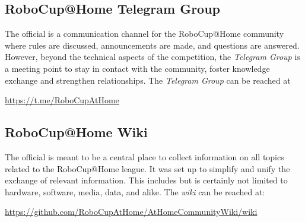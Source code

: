 \subsection{RoboCup@Home Telegram Group}
The official  is a communication channel for the RoboCup@Home community where rules are discussed, announcements are made, and questions are answered.
However, beyond the technical aspects of the competition, the \textit{Telegram Group} is a meeting point to stay in contact with the community, foster knowledge exchange and strengthen relationships.
The \textit{Telegram Group} can be reached at
\begin{center}
{\small\url{https://t.me/RoboCupAtHome}}
\end{center}

\subsection{RoboCup@Home Wiki}
\label{sec:at_home_wiki}
The official  is meant to be a central place to collect information on all topics related to the RoboCup@Home league. It was set up to simplify and unify the exchange of relevant information.
This includes but is certainly not limited to hardware, software, media, data, and alike.
The \textit{wiki} can be reached at:
\begin{center}
{\small\url{https://github.com/RoboCupAtHome/AtHomeCommunityWiki/wiki}}
\end{center}

